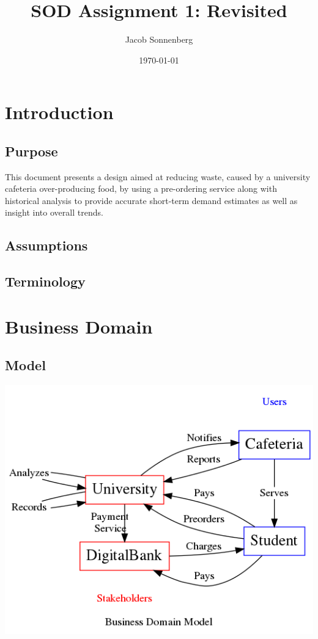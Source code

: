 \documentclass[11pt]{article}
\author{Jacob Sonnenberg}
\date{\today}
\title{SOD Assignment 1: Revisited}
\begin{document}
\maketitle
\tableofcontents

\section{Introduction}
\label{sec:org8e1c2ff}
\subsection{Purpose}
\label{sec:org554539a}
This document presents a design aimed at reducing waste, caused by
a university cafeteria over-producing food, by using a pre-ordering
service along with historical analysis to provide accurate
short-term demand estimates as well as insight into overall trends.
\subsection{Assumptions}
\label{sec:orgdb4b367}
\subsection{Terminology}
\label{sec:org9f843d0}
\section{Business Domain}
\label{sec:org4272c87}
\subsection{Model}
\label{sec:org4db7db3}
\begin{center}
\includegraphics[width=.9\linewidth]{res/business_domain.png}
\end{center}
\end{document}
